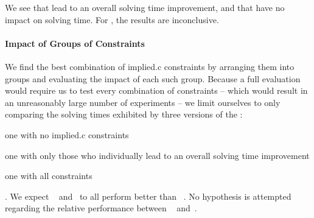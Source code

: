 We see that  lead to an overall solving time
improvement, and that  have no
impact on solving time.
%
For , the results are
inconclusive.


\paragraph{Impact of Groups of Constraints}

We find the best combination of \gls{implied.c} \glspl{constraint} by arranging
them into groups and evaluating the impact of each such group.
%
Because a full evaluation would require us to test every combination of
\glspl{constraint} -- which would result in an unreasonably large number of
experiments -- we limit ourselves to only comparing the solving times exhibited
by three versions of the :
%
\begin{modelList}
  \item {}
    one with no \gls{implied.c} \glspl{constraint}
  \item {}
    one with only those who individually lead to an overall solving time
    improvement
  \item {}
    one with all \glspl{constraint}
\end{modelList}.
%
We expect ~
and~ to all perform better than
~.
%
No hypothesis is attempted regarding the relative performance between
~
and~.



